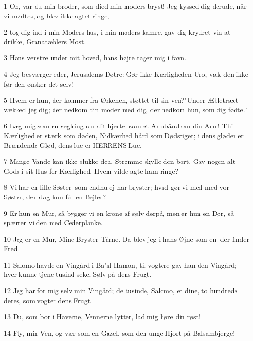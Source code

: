 \par 1 Oh, var du min broder, som died min moders bryst! Jeg kyssed dig derude, når vi mødtes, og blev ikke agtet ringe,
\par 2 tog dig ind i min Moders hus, i min moders kamre, gav dig krydret vin at drikke, Granatæblers Most.
\par 3 Hans venstre under mit hoved, hans højre tager mig i favn.
\par 4 Jeg besværger eder, Jerusalems Døtre: Gør ikke Kærligheden Uro, væk den ikke før den ønsker det selv!
\par 5 Hvem er hun, der kommer fra Ørkenen, støttet til sin ven?"Under Æbletræet vækked jeg dig; der nedkom din moder med dig, der nedkom hun, som dig fødte."
\par 6 Læg mig som en seglring om dit hjerte, som et Armbånd om din Arm! Thi Kærlighed er stærk som døden, Nidkærhed hård som Dødsriget; i dens gløder er Brændende Glød, dens lue er HERRENS Lue.
\par 7 Mange Vande kan ikke slukke den, Strømme skylle den bort. Gav nogen alt Gods i sit Hus for Kærlighed, Hvem vilde agte ham ringe?
\par 8 Vi har en lille Søster, som endnu ej har bryster; hvad gør vi med med vor Søster, den dag hun får en Bejler?
\par 9 Er hun en Mur, så bygger vi en krone af sølv derpå, men er hun en Dør, så spærrer vi den med Cederplanke.
\par 10 Jeg er en Mur, Mine Bryster Tårne. Da blev jeg i hans Øjne som en, der finder Fred.
\par 11 Salomo havde en Vingård i Ba'al-Hamon, til vogtere gav han den Vingård; hver kunne tjene tusind sekel Sølv på dens Frugt.
\par 12 Jeg har for mig selv min Vingård; de tusinde, Salomo, er dine, to hundrede deres, som vogter dens Frugt.
\par 13 Du, som bor i Haverne, Vennerne lytter, lad mig høre din røst!
\par 14 Fly, min Ven, og vær som en Gazel, som den unge Hjort på Balsambjerge!


